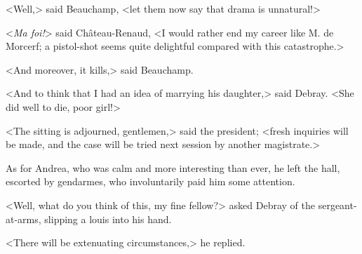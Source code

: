  <Well,> said Beauchamp, <let them now say that drama is unnatural!> 

 <\textit{Ma foi!}> said Château-Renaud, <I would rather end my career like M. de Morcerf; a pistol-shot seems quite delightful compared with this catastrophe.> 

 <And moreover, it kills,> said Beauchamp. 

 <And to think that I had an idea of marrying his daughter,> said Debray. <She did well to die, poor girl!> 

 <The sitting is adjourned, gentlemen,> said the president; <fresh inquiries will be made, and the case will be tried next session by another magistrate.> 

 As for Andrea, who was calm and more interesting than ever, he left the hall, escorted by gendarmes, who involuntarily paid him some attention. 

 <Well, what do you think of this, my fine fellow?> asked Debray of the sergeant-at-arms, slipping a louis into his hand. 

 <There will be extenuating circumstances,> he replied. 